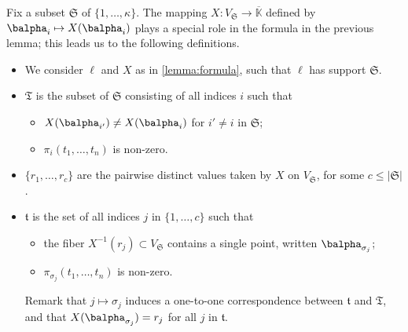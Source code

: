 \documentclass[12pt]{article}
\newcommand{\lf}{X}
\def\dg{\kappa}
\def\Kbar {{\ensuremath{\overline{\mathbb{K}}}}}
\begin{document}
Fix a subset $\mathfrak{S}$ of $\{1,\dots,\dg\}$. The mapping
$\lf:V_\mathfrak{S} \to \Kbar$ defined by $\balpha_i \mapsto
\lf(\balpha_{i})$ plays a special role in the formula in the previous
lemma; this leads us to the following definitions.
\begin{itemize}
\item We consider $\ell$ and $\lf$ as in \cref{lemma:formula}, such
  that $\ell$ has support $\mathfrak{S}$.
\item $\mathfrak{T}$ is the subset of $\mathfrak{S}$ consisting of
  all indices $i$ such that 
  \begin{itemize}
  \item $\lf(\balpha_{i'}) \ne \lf(\balpha_i)$ for $i' \ne i$ in $\mathfrak{S}$;
  \item $\pi_i(t_1,\dots,t_n)$ is non-zero.
  \end{itemize}
\item $\{r_1,\dots,r_c\}$ are the pairwise distinct values taken by $\lf$ on
  $V_\mathfrak{S}$, for some $c \le |\mathfrak{S}|$.
\item $\mathfrak{t}$ is the set of all indices $j$ in
  $\{1,\dots,c\}$ such that
  \begin{itemize}
  \item the fiber $\lf^{-1}(r_j) \subset V_{\mathfrak{S}}$ contains a single
    point, written $\balpha_{\sigma_j}$;
  \item   $\pi_{\sigma_j}(t_1,\dots,t_n)$ is non-zero.
  \end{itemize}
  Remark that $j \mapsto \sigma_j$ induces a one-to-one correspondence
  between  $\mathfrak{t}$ and  $\mathfrak{T}$, and that $\lf(\balpha_{\sigma_j})=r_j$ 
  for all $j$ in $\mathfrak{t}$.
\end{itemize}
\end{document}
